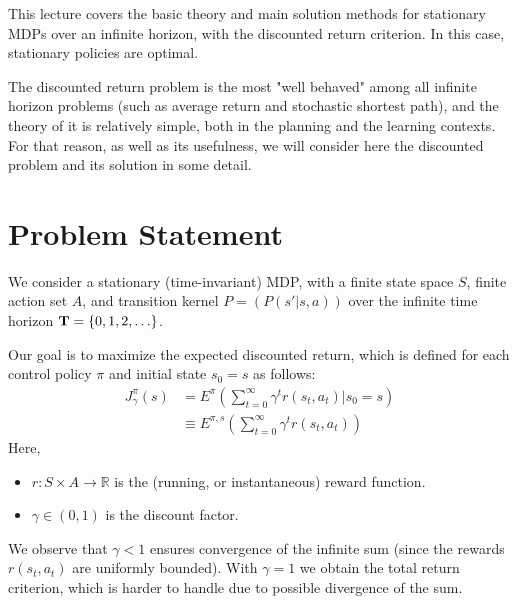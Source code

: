 This lecture covers the basic theory and main solution methods for stationary MDPs over an infinite horizon, with the discounted return criterion. In this case, stationary policies are optimal.

The discounted return problem is the most "well behaved" among all infinite horizon problems (such as average return and stochastic shortest path), and the theory of it is relatively simple, both in the planning and the learning contexts. For that reason, as well as its usefulness, we will consider here the discounted problem and its solution in some detail.


\section{Problem Statement}\label{sec:inf_horizon_prob}

We consider a stationary (time-invariant) MDP, with a finite state space $S$, finite action set $A$, and transition kernel $P = (P(s'|s,a))$ over the infinite time horizon ${\bf{T}} = \{ 0,1,2, \ldots \} $.

Our goal is to maximize the expected discounted return, which is defined for each control policy $\pi $ and initial state ${s_0} = s$ as follows:
\begin{align*}
J_\gamma ^\pi (s) &= {E^\pi }(\sum\limits_{t = 0}^\infty  {{\gamma ^t}r({s_t},{a_t})} |{s_0} = s)\\
 &\equiv {E^{\pi ,s}}(\sum\limits_{t = 0}^\infty  {{\gamma ^t}r({s_t},{a_t})} )
\end{align*}
Here,
\begin{itemize}
  \item $r : S\times A \to \mathbb R$ is the (running, or instantaneous) reward function.
  \item $\gamma  \in (0,1)$ is the discount factor.
\end{itemize}

We observe that $\gamma  < 1$  ensures convergence of the infinite sum (since the rewards $r({s_t},{a_t})$ are uniformly bounded). With $\gamma  = 1$ we obtain the total return criterion, which is harder to handle due to possible divergence of the sum.

